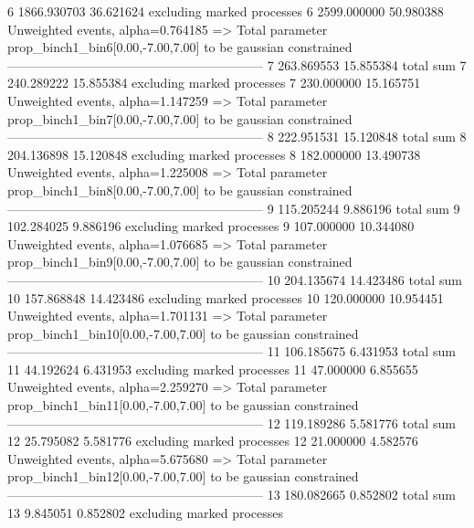 6          1866.930703     36.621624       excluding marked processes    
6          2599.000000     50.980388       Unweighted events, alpha=0.764185
  => Total parameter prop_binch1_bin6[0.00,-7.00,7.00] to be gaussian constrained
------------------------------------------------------------
7          263.869553      15.855384       total sum                     
7          240.289222      15.855384       excluding marked processes    
7          230.000000      15.165751       Unweighted events, alpha=1.147259
  => Total parameter prop_binch1_bin7[0.00,-7.00,7.00] to be gaussian constrained
------------------------------------------------------------
8          222.951531      15.120848       total sum                     
8          204.136898      15.120848       excluding marked processes    
8          182.000000      13.490738       Unweighted events, alpha=1.225008
  => Total parameter prop_binch1_bin8[0.00,-7.00,7.00] to be gaussian constrained
------------------------------------------------------------
9          115.205244      9.886196        total sum                     
9          102.284025      9.886196        excluding marked processes    
9          107.000000      10.344080       Unweighted events, alpha=1.076685
  => Total parameter prop_binch1_bin9[0.00,-7.00,7.00] to be gaussian constrained
------------------------------------------------------------
10         204.135674      14.423486       total sum                     
10         157.868848      14.423486       excluding marked processes    
10         120.000000      10.954451       Unweighted events, alpha=1.701131
  => Total parameter prop_binch1_bin10[0.00,-7.00,7.00] to be gaussian constrained
------------------------------------------------------------
11         106.185675      6.431953        total sum                     
11         44.192624       6.431953        excluding marked processes    
11         47.000000       6.855655        Unweighted events, alpha=2.259270
  => Total parameter prop_binch1_bin11[0.00,-7.00,7.00] to be gaussian constrained
------------------------------------------------------------
12         119.189286      5.581776        total sum                     
12         25.795082       5.581776        excluding marked processes    
12         21.000000       4.582576        Unweighted events, alpha=5.675680
  => Total parameter prop_binch1_bin12[0.00,-7.00,7.00] to be gaussian constrained
------------------------------------------------------------
13         180.082665      0.852802        total sum                     
13         9.845051        0.852802        excluding marked processes    
